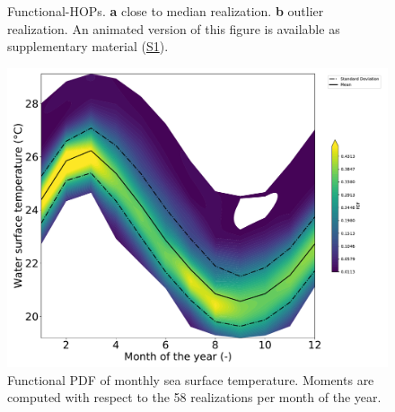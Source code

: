 \begin{figure}[!h]               
\centering
{}
\caption{Functional-HOPs. \textbf{a} close to median realization. \textbf{b} outlier realization. An animated version of this figure is available as supplementary material (\hyperref[S1]{S1}).}
\label{fig:f-hops}
\end{figure}

\begin{figure}[!h]
\centering
\includegraphics[width=0.8\linewidth,keepaspectratio]{fig/contributions/visu/pdf.pdf}
\caption{Functional PDF of monthly sea surface temperature. Moments are computed with respect to the 58 realizations per month of the year.}
\label{fig:pdf}
\end{figure}

